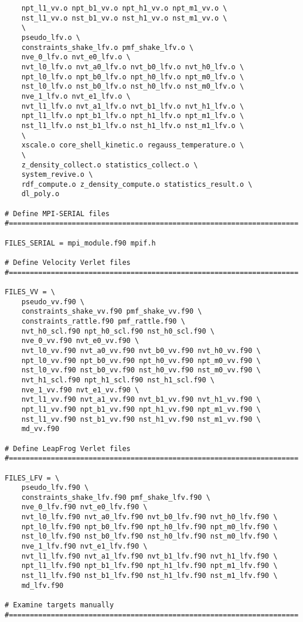 \begin{verbatim}
	npt_l1_vv.o npt_b1_vv.o npt_h1_vv.o npt_m1_vv.o \
	nst_l1_vv.o nst_b1_vv.o nst_h1_vv.o nst_m1_vv.o \
	\
	pseudo_lfv.o \
	constraints_shake_lfv.o pmf_shake_lfv.o \
	nve_0_lfv.o nvt_e0_lfv.o \
	nvt_l0_lfv.o nvt_a0_lfv.o nvt_b0_lfv.o nvt_h0_lfv.o \
	npt_l0_lfv.o npt_b0_lfv.o npt_h0_lfv.o npt_m0_lfv.o \
	nst_l0_lfv.o nst_b0_lfv.o nst_h0_lfv.o nst_m0_lfv.o \
	nve_1_lfv.o nvt_e1_lfv.o \
	nvt_l1_lfv.o nvt_a1_lfv.o nvt_b1_lfv.o nvt_h1_lfv.o \
	npt_l1_lfv.o npt_b1_lfv.o npt_h1_lfv.o npt_m1_lfv.o \
	nst_l1_lfv.o nst_b1_lfv.o nst_h1_lfv.o nst_m1_lfv.o \
	\
	xscale.o core_shell_kinetic.o regauss_temperature.o \
	\
	z_density_collect.o statistics_collect.o \
	system_revive.o \
	rdf_compute.o z_density_compute.o statistics_result.o \
	dl_poly.o

# Define MPI-SERIAL files
#=====================================================================

FILES_SERIAL = mpi_module.f90 mpif.h

# Define Velocity Verlet files
#=====================================================================

FILES_VV = \
	pseudo_vv.f90 \
	constraints_shake_vv.f90 pmf_shake_vv.f90 \
	constraints_rattle.f90 pmf_rattle.f90 \
	nvt_h0_scl.f90 npt_h0_scl.f90 nst_h0_scl.f90 \
	nve_0_vv.f90 nvt_e0_vv.f90 \
	nvt_l0_vv.f90 nvt_a0_vv.f90 nvt_b0_vv.f90 nvt_h0_vv.f90 \
	npt_l0_vv.f90 npt_b0_vv.f90 npt_h0_vv.f90 npt_m0_vv.f90 \
	nst_l0_vv.f90 nst_b0_vv.f90 nst_h0_vv.f90 nst_m0_vv.f90 \
	nvt_h1_scl.f90 npt_h1_scl.f90 nst_h1_scl.f90 \
	nve_1_vv.f90 nvt_e1_vv.f90 \
	nvt_l1_vv.f90 nvt_a1_vv.f90 nvt_b1_vv.f90 nvt_h1_vv.f90 \
	npt_l1_vv.f90 npt_b1_vv.f90 npt_h1_vv.f90 npt_m1_vv.f90 \
	nst_l1_vv.f90 nst_b1_vv.f90 nst_h1_vv.f90 nst_m1_vv.f90 \
	md_vv.f90

# Define LeapFrog Verlet files
#=====================================================================

FILES_LFV = \
	pseudo_lfv.f90 \
	constraints_shake_lfv.f90 pmf_shake_lfv.f90 \
	nve_0_lfv.f90 nvt_e0_lfv.f90 \
	nvt_l0_lfv.f90 nvt_a0_lfv.f90 nvt_b0_lfv.f90 nvt_h0_lfv.f90 \
	npt_l0_lfv.f90 npt_b0_lfv.f90 npt_h0_lfv.f90 npt_m0_lfv.f90 \
	nst_l0_lfv.f90 nst_b0_lfv.f90 nst_h0_lfv.f90 nst_m0_lfv.f90 \
	nve_1_lfv.f90 nvt_e1_lfv.f90 \
	nvt_l1_lfv.f90 nvt_a1_lfv.f90 nvt_b1_lfv.f90 nvt_h1_lfv.f90 \
	npt_l1_lfv.f90 npt_b1_lfv.f90 npt_h1_lfv.f90 npt_m1_lfv.f90 \
	nst_l1_lfv.f90 nst_b1_lfv.f90 nst_h1_lfv.f90 nst_m1_lfv.f90 \
	md_lfv.f90

# Examine targets manually
#=====================================================================


\end{verbatim}
